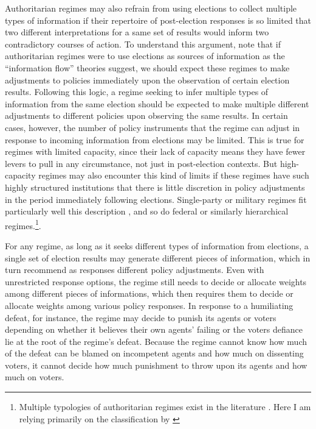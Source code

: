 \documentclass[12pt]{article}\usepackage[]{graphicx}\usepackage[]{color}
\newcommand{\1}{\mathbbm{1}}
\begin{document}
Authoritarian regimes may also refrain from using elections to collect multiple types of information if their repertoire of post-election responses is so limited that two different interpretations for a same set of results would inform two contradictory courses of action. To understand this argument, note that if authoritarian regimes were to use elections as sources of information as the ``information flow'' theories suggest, we should expect these regimes to make adjustments to policies immediately upon the observation of certain election results. Following this logic, a regime seeking to infer multiple types of information from the same election should be expected to make multiple different adjustments to different policies upon observing the same results. In certain cases, however, the number of policy instruments that the regime can adjust in response to incoming information from elections may be limited. This is true for regimes with limited capacity, since their lack of capacity means they have fewer levers to pull in any circumstance, not just in post-election contexts. But high-capacity regimes may also encounter this kind of limits if these regimes have such highly structured institutions that there is little discretion in policy adjustments in the period immediately following elections. Single-party or military regimes fit particularly well this description , and so do federal or similarly hierarchical regimes.\footnote{Multiple typologies of authoritarian regimes exist in the literature \citep[see, for instance,][]{GeddesWrightFrantz2014, Wahman2013}. Here I am relying primarily on the classification by \citet{GeddesWrightFrantz2014}}.

For any regime, as long as it seeks different types of information from elections, a single set of election results may generate different pieces of information, which in turn recommend as responses different policy adjustments. Even with unrestricted response options, the regime still needs to decide or allocate weights among different pieces of informations, which then requires them to decide or allocate weights among various policy responses. In response to a humiliating defeat, for instance, the regime may decide to punish its agents or voters depending on whether it believes their own agents' failing or the voters defiance lie at the root of the regime's defeat. Because the regime cannot know how much of the defeat can be blamed on incompetent agents and how much on dissenting voters, it cannot decide how much punishment to throw upon its agents and how much on voters.
\end{document}
